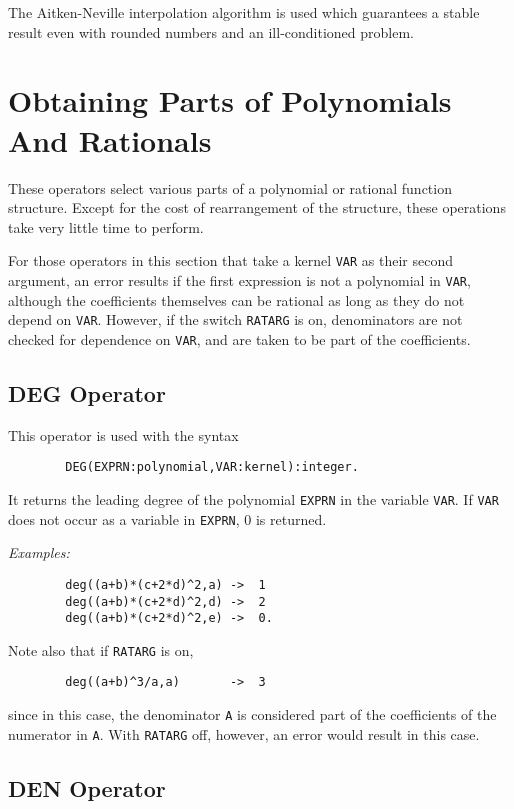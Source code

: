 The Aitken-Neville interpolation algorithm is used which guarantees a
stable result even with rounded numbers and an ill-conditioned problem.

\section{Obtaining Parts of Polynomials And Rationals}

These operators select various parts of a polynomial or rational function
structure. Except for the cost of rearrangement of the structure, these
operations take very little time to perform.

For those operators in this section that take a kernel {\tt VAR} as their
second argument, an error results if the first expression is not a
polynomial in {\tt VAR}, although the coefficients themselves can be
rational as long as they do not depend on {\tt VAR}.  However, if the
switch {\tt RATARG}  is on, denominators are not checked
for dependence on {\tt VAR}, and are taken to be part of the coefficients.

\subsection{DEG Operator}

This operator is used with the syntax
\begin{verbatim}
        DEG(EXPRN:polynomial,VAR:kernel):integer.
\end{verbatim}
It returns the leading degree of the polynomial {\tt EXPRN}
in the variable {\tt VAR}.  If {\tt VAR} does not occur as a variable in
{\tt EXPRN}, 0 is returned.

{\it Examples:}
\begin{verbatim}
        deg((a+b)*(c+2*d)^2,a) ->  1
        deg((a+b)*(c+2*d)^2,d) ->  2
        deg((a+b)*(c+2*d)^2,e) ->  0.
\end{verbatim}
Note also that if {\tt RATARG} is on,
\begin{verbatim}
        deg((a+b)^3/a,a)       ->  3
\end{verbatim}
since in this case, the denominator {\tt A} is considered part of the
coefficients of the numerator in {\tt A}.  With {\tt RATARG} off, however,
an error would result in this case.

\subsection{DEN Operator}

